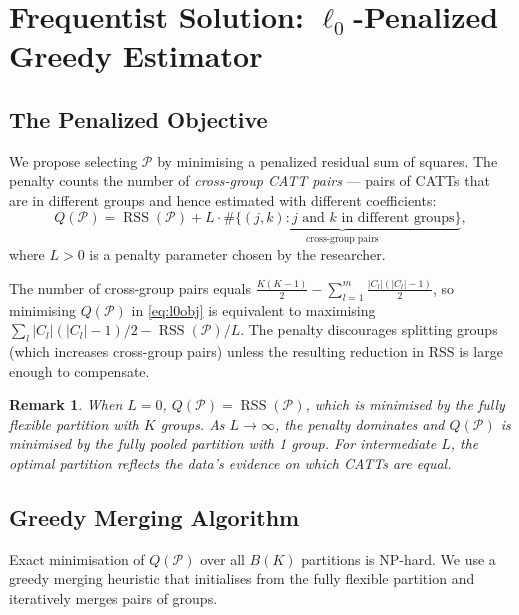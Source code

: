 \documentclass[margin=3in, 12pt]{article}
\newtheorem{remark}{Remark}
\DeclareMathOperator{\RSS}{RSS}
\newcommand{\1}{\mathbbm{1}}
\begin{document}
\section{Frequentist Solution: $\ell_0$-Penalized Greedy Estimator}
\label{sec:freq}

\subsection{The Penalized Objective}

We propose selecting $\mathcal{P}$ by minimising a penalized residual sum of
squares. The penalty counts the number of \emph{cross-group CATT pairs} ---
pairs of CATTs that are in different groups and hence estimated with different
coefficients:
\begin{equation}
  Q(\mathcal{P}) = \RSS(\mathcal{P})
    + L \cdot \underbrace{\#\{(j,k): j \text{ and } k \text{ in different groups}\}}_{\text{cross-group pairs}},
  \label{eq:l0obj}
\end{equation}
where $L > 0$ is a penalty parameter chosen by the researcher.

The number of cross-group pairs equals
$\frac{K(K-1)}{2} - \sum_{l=1}^{m}\frac{|C_l|(|C_l|-1)}{2}$, so
minimising $Q(\mathcal{P})$ in \eqref{eq:l0obj} is equivalent to
maximising $\sum_{l} |C_l|(|C_l|-1)/2 - \RSS(\mathcal{P})/L$.
The penalty discourages splitting groups (which increases cross-group pairs)
unless the resulting reduction in RSS is large enough to compensate.

\begin{remark}
  When $L=0$, $Q(\mathcal{P}) = \RSS(\mathcal{P})$, which is minimised by
  the fully flexible partition with $K$ groups.
  As $L \to \infty$, the penalty dominates and $Q(\mathcal{P})$ is
  minimised by the fully pooled partition with 1 group.
  For intermediate $L$, the optimal partition reflects the data's evidence
  on which CATTs are equal.
\end{remark}

\subsection{Greedy Merging Algorithm}

Exact minimisation of $Q(\mathcal{P})$ over all $B(K)$ partitions is
NP-hard. We use a greedy merging heuristic that initialises from the fully
flexible partition and iteratively merges pairs of groups.
\end{document}
